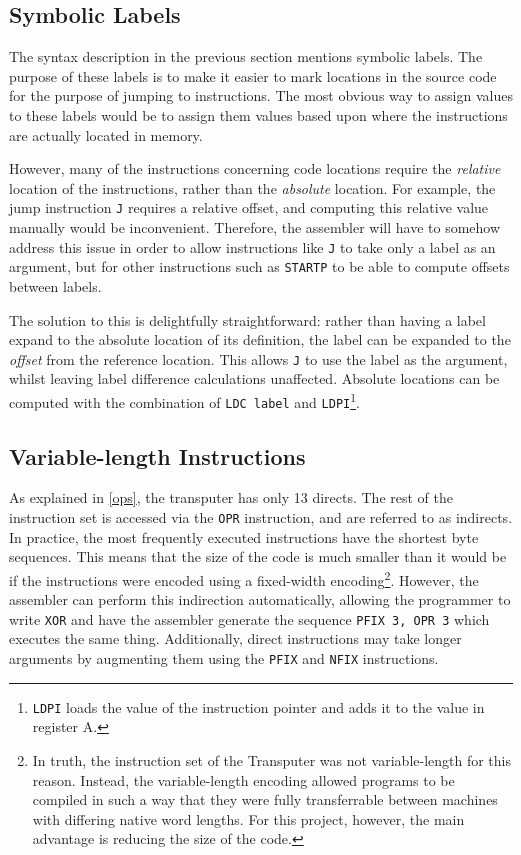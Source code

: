 \subsection{Symbolic Labels}

The syntax description in the previous section mentions symbolic labels. The
purpose of these labels is to make it easier to mark locations in the source
code for the purpose of jumping to instructions. The most obvious way to assign
values to these labels would be to assign them values based upon where the
instructions are actually located in memory.

However, many of the instructions concerning code locations require the
\textit{relative} location of the instructions, rather than the
\textit{absolute} location. For example, the jump instruction \texttt{J}
requires a relative offset, and computing this relative value manually would be
inconvenient. Therefore, the assembler will have to somehow address this issue
in order to allow instructions like \texttt{J} to take only a label as an
argument, but for other instructions such as \texttt{STARTP} to be able to
compute offsets between labels.

The solution to this is delightfully straightforward: rather than having a label
expand to the absolute location of its definition, the label can be expanded to
the \textit{offset} from the reference
location\textsuperscript{\cite{supervisor}}. This allows \texttt{J} to use the
label as the argument, whilst leaving label difference calculations unaffected.
Absolute locations can be computed with the combination of \texttt{LDC label}
and \texttt{LDPI}\footnote{\texttt{LDPI} loads the value of the instruction
pointer and adds it to the value in register A.}.

\subsection{Variable-length Instructions}

As explained in \ref{ops}, the \Gls{transputer} has only 13 \gls{direct}s. The
rest of the instruction set is accessed via the \texttt{OPR} instruction, and
are referred to as \gls{indirect}s. In practice, the most frequently executed
instructions have the shortest byte sequences. This means that the size of the
code is much smaller than it would be if the instructions were encoded using a
fixed-width encoding\footnote{In truth, the instruction set of the Transputer
was not variable-length for this reason. Instead, the variable-length encoding
allowed programs to be compiled in such a way that they were fully transferrable
between machines with differing native word lengths. For this project, however,
the main advantage is reducing the size of the code.}. However, the assembler
can perform this indirection automatically, allowing the programmer to write
\texttt{XOR} and have the assembler generate the sequence \texttt{PFIX 3, OPR 3}
which executes the same thing. Additionally, direct instructions may take longer
arguments by augmenting them using the \texttt{PFIX} and \texttt{NFIX}
instructions.


